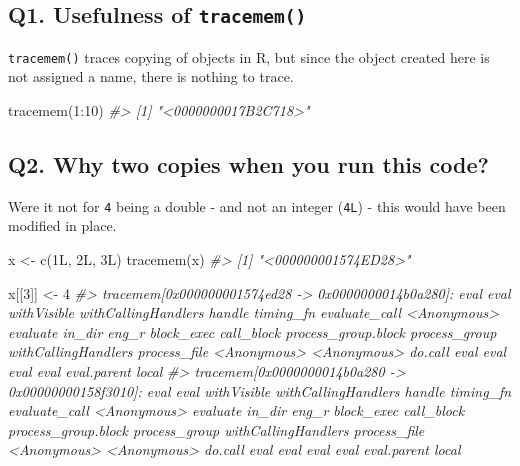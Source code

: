 \documentclass[
]{book}
\newenvironment{Shaded}{\begin{snugshade}}{\end{snugshade}}
\newcommand{\CommentTok}[1]{\textcolor[rgb]{0.56,0.35,0.01}{\textit{#1}}}
\newcommand{\DecValTok}[1]{\textcolor[rgb]{0.00,0.00,0.81}{#1}}
\newcommand{\FunctionTok}[1]{\textcolor[rgb]{0.00,0.00,0.00}{#1}}
\newcommand{\NormalTok}[1]{#1}
\newcommand{\OtherTok}[1]{\textcolor[rgb]{0.56,0.35,0.01}{#1}}
\newcommand{\SpecialCharTok}[1]{\textcolor[rgb]{0.00,0.00,0.00}{#1}}
\begin{document}
\hypertarget{q1.-usefulness-of-tracemem}{%
\subsection*{\texorpdfstring{Q1. Usefulness of \texttt{tracemem()}}{Q1. Usefulness of tracemem()}}\label{q1.-usefulness-of-tracemem}}

\texttt{tracemem()} traces copying of objects in R, but since the object created here is not assigned a name, there is nothing to trace.

\begin{Shaded}
\begin{Highlighting}[]
\FunctionTok{tracemem}\NormalTok{(}\DecValTok{1}\SpecialCharTok{:}\DecValTok{10}\NormalTok{)}
\CommentTok{\#\textgreater{} [1] "\textless{}0000000017B2C718\textgreater{}"}
\end{Highlighting}
\end{Shaded}

\hypertarget{q2.-why-two-copies-when-you-run-this-code}{%
\subsection*{Q2. Why two copies when you run this code?}\label{q2.-why-two-copies-when-you-run-this-code}}

Were it not for \texttt{4} being a double - and not an integer (\texttt{4L}) - this would have been modified in place.

\begin{Shaded}
\begin{Highlighting}[]
\NormalTok{x }\OtherTok{\textless{}{-}} \FunctionTok{c}\NormalTok{(1L, 2L, 3L)}
\FunctionTok{tracemem}\NormalTok{(x)}
\CommentTok{\#\textgreater{} [1] "\textless{}000000001574ED28\textgreater{}"}

\NormalTok{x[[}\DecValTok{3}\NormalTok{]] }\OtherTok{\textless{}{-}} \DecValTok{4}
\CommentTok{\#\textgreater{} tracemem[0x000000001574ed28 {-}\textgreater{} 0x0000000014b0a280]: eval eval withVisible withCallingHandlers handle timing\_fn evaluate\_call \textless{}Anonymous\textgreater{} evaluate in\_dir eng\_r block\_exec call\_block process\_group.block process\_group withCallingHandlers process\_file \textless{}Anonymous\textgreater{} \textless{}Anonymous\textgreater{} do.call eval eval eval eval eval.parent local }
\CommentTok{\#\textgreater{} tracemem[0x0000000014b0a280 {-}\textgreater{} 0x00000000158f3010]: eval eval withVisible withCallingHandlers handle timing\_fn evaluate\_call \textless{}Anonymous\textgreater{} evaluate in\_dir eng\_r block\_exec call\_block process\_group.block process\_group withCallingHandlers process\_file \textless{}Anonymous\textgreater{} \textless{}Anonymous\textgreater{} do.call eval eval eval eval eval.parent local}
\end{Highlighting}
\end{Shaded}
\end{document}
